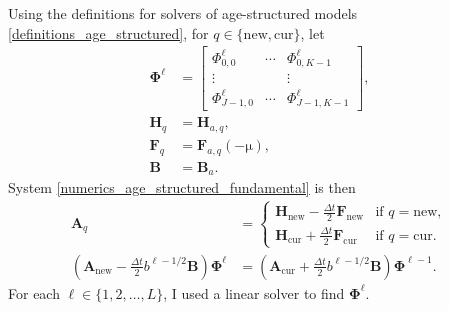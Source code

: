 \documentclass[USenglish]{article}
\renewcommand{\vec}[1]{\boldsymbol{\mathrm{#1}}}
\newcommand{\mat}[1]{\mathbf{#1}}
\begin{document}
Using the definitions for solvers of age-structured models
\eqref{definitions_age_structured},
for $q \in \{\mathrm{new}, \mathrm{cur}\}$, let
\begin{subequations}
  \begin{align}
    \mat{\Phi}^{\ell}
    &=
    \begin{bmatrix}
      \Phi_{0, 0}^{\ell} & \cdots & \Phi_{0, K - 1}^{\ell} \\
      \vdots & & \vdots \\
      \Phi_{J - 1, 0}^{\ell} & \cdots & \Phi_{J - 1, K - 1}^{\ell}
    \end{bmatrix},
    \\
    \mat{H}_q &= \mat{H}_{a, q},
    \\
    \mat{F}_q &= \mat{F}_{a, q}(-\vec{\mu}),
    \\
    \mat{B} &= \mat{B}_a.
  \end{align}
\end{subequations}
System \eqref{numerics_age_structured_fundamental} is then
\begin{subequations}
  \begin{align}
    \mat{A}_q &=
    \begin{cases}
      \mat{H}_{\mathrm{new}} - \frac{\Delta t}{2} \mat{F}_{\mathrm{new}}
      & \text{if $q = \mathrm{new}$},
      \\
      \mat{H}_{\mathrm{cur}} + \frac{\Delta t}{2} \mat{F}_{\mathrm{cur}}
      & \text{if $q = \mathrm{cur}$}.
    \end{cases}
    \\
    \left(
      \mat{A}_{\mathrm{new}}
      - \frac{\Delta t}{2} b^{\ell - 1 / 2} \mat{B}
    \right)
    \mat{\Phi}^{\ell} &=
    \left(
      \mat{A}_{\mathrm{cur}}
      + \frac{\Delta t}{2} b^{\ell - 1 / 2} \mat{B}
    \right)
    \mat{\Phi}^{\ell - 1}.
  \end{align}
\end{subequations}
For each $\ell \in \{1, 2, \ldots, L\}$, I used a linear solver
to find $\mat{\Phi}^{\ell}$.
\end{document}
